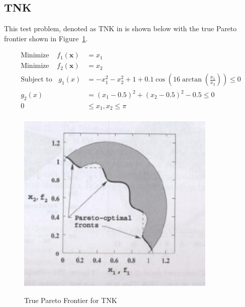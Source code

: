 \documentclass{article}
\begin{document}
\subsection{TNK} 
This test problem, denoted as TNK in \cite{deb2001multi} is shown below with the true Pareto frontier shown in Figure~\ref{fig:TNK_true}.

\begin{align*}
\textrm{Minimize} ~~~~~ f_1(\textbf{x}) &= x_1 \\
\textrm{Minimize} ~~~~~ f_2(\textbf{x}) &= x_2 \\
\textrm{Subject to} ~~~~ g_1(x) &= -x_1^2-x_2^2+1+0.1\cos(16\arctan(\frac{x_1}{x_2})) \leq 0 \\
g_2(x) &= (x_1 - 0.5)^2 + (x_2 - 0.5)^2 -0.5 \leq 0 \\
0 &\leq  x_1,x_2 \leq \pi \\
\end{align*}
\begin{figure}[H]
  \caption{True Pareto Frontier for TNK}
  \centering
  \includegraphics[width=0.85\textwidth]{TNK_pareto_true.png}  
  \label{fig:TNK_true}
\end{figure}
\end{document}
